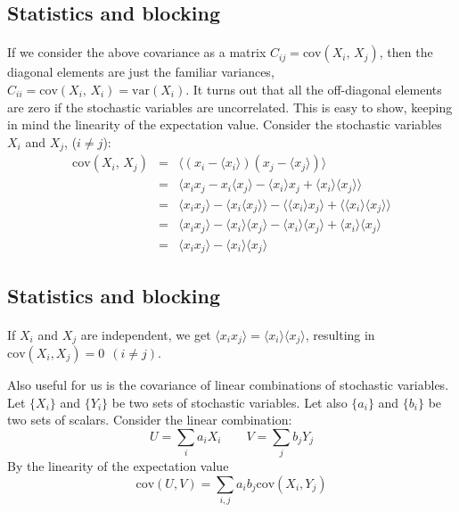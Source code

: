 \documentclass[%
twoside,                 %
final,                   %
10pt]{article}
\begin{document}
\subsection{Statistics and blocking}

\paragraph{}
If we consider the above covariance as a matrix $C_{ij}=\mathrm{cov}(X_i,\,X_j)$, then the diagonal elements are just the familiar
variances, $C_{ii} = \mathrm{cov}(X_i,\,X_i) = \mathrm{var}(X_i)$. It turns out that
all the off-diagonal elements are zero if the stochastic variables are
uncorrelated. This is easy to show, keeping in mind the linearity of
the expectation value. Consider the stochastic variables $X_i$ and
$X_j$, ($i\neq j$):
\begin{eqnarray}
\mathrm{cov}(X_i,\,X_j) &=& \langle(x_i-\langle x_i\rangle)(x_j-\langle x_j\rangle)\rangle\\
&=&\langle x_i x_j - x_i\langle x_j\rangle - \langle x_i\rangle x_j + \langle x_i\rangle\langle x_j\rangle\rangle \\
&=&\langle x_i x_j\rangle - \langle x_i\langle x_j\rangle\rangle - \langle \langle x_i\rangle x_j\rangle +
\langle \langle x_i\rangle\langle x_j\rangle\rangle\\
&=&\langle x_i x_j\rangle - \langle x_i\rangle\langle x_j\rangle - \langle x_i\rangle\langle x_j\rangle +
\langle x_i\rangle\langle x_j\rangle\\
&=&\langle x_i x_j\rangle - \langle x_i\rangle\langle x_j\rangle
\end{eqnarray}





\subsection{Statistics and blocking}

\paragraph{}
If $X_i$ and $X_j$ are independent, we get 
$\langle x_i x_j\rangle =\langle x_i\rangle\langle x_j\rangle$, resulting in $\mathrm{cov}(X_i, X_j) = 0\ \ (i\neq j)$.

Also useful for us is the covariance of linear combinations of
stochastic variables. Let $\{X_i\}$ and $\{Y_i\}$ be two sets of
stochastic variables. Let also $\{a_i\}$ and $\{b_i\}$ be two sets of
scalars. Consider the linear combination:
\[
U = \sum_i a_i X_i \qquad V = \sum_j b_j Y_j
\]
By the linearity of the expectation value
\[
\mathrm{cov}(U, V) = \sum_{i,j}a_i b_j \mathrm{cov}(X_i, Y_j)
\]
\end{document}
